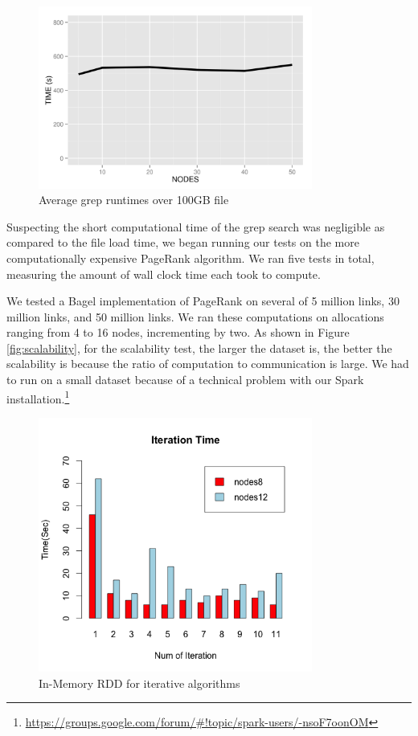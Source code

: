 \documentclass{article}
\begin{document}
    \begin{figure}[H]
        \centering
        \includegraphics[width=90mm]{images/bigDataTimes.png}
        \caption{Average grep runtimes over 100GB file}
        \label{fig:bigTime}
    \end{figure}

Suspecting the short computational time of the grep search was negligible as
compared to the file load time, we began running our tests on the more
computationally expensive PageRank algorithm. We ran five tests in total,
measuring the amount of wall clock time each took to compute.

We tested a Bagel implementation of PageRank on several of 5 million links, 30
million links, and 50 million links. We ran these computations on allocations
ranging from 4 to 16 nodes, incrementing by two.  As shown in Figure
\ref{fig:scalability}, for the scalability test, the larger the dataset is, the
better the scalability is because the ratio of computation to communication is
large. We had to run on a small dataset because of a technical problem with our
Spark installation.\footnote{
\url{https://groups.google.com/forum/#!topic/spark-users/-nsoF7oonOM}}

\begin{figure}[H]
        \centering
        \includegraphics[width=90mm]{images/in-mem.png}
        \caption{In-Memory RDD for iterative algorithms}
        \label{fig:in-memory}
    \end{figure}
\end{document}
